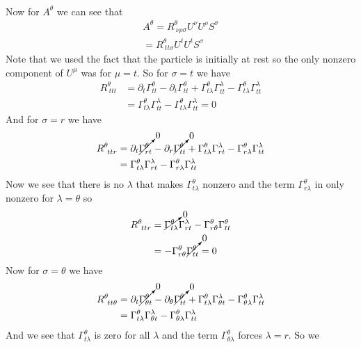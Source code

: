 \documentclass[11pt]{article}
\numberwithin{equation}{section}
\begin{document}
\begin{enumerate}[(a)]
\begin{align*}
\end{align*}
Now for $A^{\theta}$ we can see that
\begin{align*}
A^{\theta} = R^{\theta}_{\ \nu\rho\sigma}U^{\nu}U^{\rho}S^{\sigma}\\
= R^{\theta}_{\ tt\sigma}U^{t}U^{t}S^{\sigma}
\end{align*}
Note that we used the fact that the particle is initially at rest so the only nonzero component of $U^{\mu}$ was for $\mu=t$. So for $\sigma = t$ we have
\begin{align*}
R^{\theta}_{\ ttt} &= \partial_{t}\Gamma^{\theta}_{t t}-\partial_{t}\Gamma^{\theta}_{t t} +\Gamma^{\theta}_{t\lambda}\Gamma^{\lambda}_{t t} - \Gamma^{\theta}_{t\lambda}\Gamma^{\lambda}_{t t}\\
&= \Gamma^{\theta}_{t\lambda}\Gamma^{\lambda}_{t t} - \Gamma^{\theta}_{t\lambda}\Gamma^{\lambda}_{t t} = 0
\end{align*}
And for $\sigma = r$ we have
\begin{align*}
R^{\theta}_{\ ttr} &= \partial_{t}\cancelto{0}{\Gamma^{\theta}_{r t}} - \partial_{r}\cancelto{0}{\Gamma^{\theta}_{t t}} +\Gamma^{\theta}_{t\lambda}\Gamma^{\lambda}_{r t} - \Gamma^{\theta}_{r\lambda}\Gamma^{\lambda}_{t t}\\
&= \Gamma^{\theta}_{t\lambda}\Gamma^{\lambda}_{r t} - \Gamma^{\theta}_{r\lambda}\Gamma^{\lambda}_{t t}
\end{align*}
Now we see that there is no $\lambda$ that makes $\Gamma^{\theta}_{t\lambda}$ nonzero and the term $\Gamma^{\theta}_{r\lambda}$ in only nonzero for $\lambda = \theta$ so 
\begin{align*}
R^{\theta}_{\ ttr} &= \cancelto{0}{\Gamma^{\theta}_{t\lambda}}\Gamma^{\lambda}_{r t} - \Gamma^{\theta}_{r\theta}\Gamma^{\theta}_{t t}\\
&=  -\Gamma^{\theta}_{r\theta}\cancelto{0}{\Gamma^{\theta}_{t t}} = 0
\end{align*}
Now for $\sigma = \theta$ we have
\begin{align*}
R^{\theta}_{\ tt\theta} &= \partial_{t}\cancelto{0}{\Gamma^{\theta}_{\theta t}} - \partial_{\theta}\cancelto{0}{\Gamma^{\theta}_{t t}} +\Gamma^{\theta}_{t\lambda}\Gamma^{\lambda}_{\theta t} - \Gamma^{\theta}_{\theta\lambda}\Gamma^{\lambda}_{t t}\\
&= \Gamma^{\theta}_{t\lambda}\Gamma^{\lambda}_{\theta t} - \Gamma^{\theta}_{\theta\lambda}\Gamma^{\lambda}_{t t}
\end{align*}
And we see that $\Gamma^{\theta}_{t\lambda}$ is zero for all $\lambda$ and the term $\Gamma^{\theta}_{\theta\lambda}$ forces $\lambda = r$. So we 

\end{enumerate}
\end{document}
